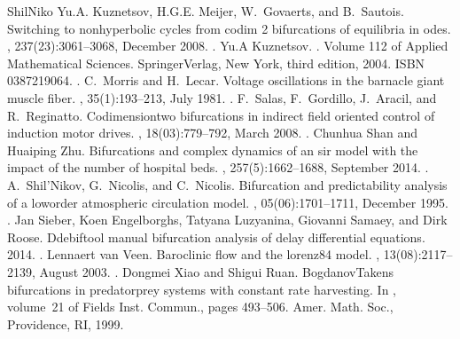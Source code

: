 \documentclass[letterpaper,10pt,english]{jupyterBook}
\begin{document}
\begin{sphinxthebibliography}{ShilNiko}
\sphinxAtStartPar
Yu.A. Kuznetsov, H.G.E. Meijer, W. Govaerts, and B. Sautois. Switching to nonhyperbolic cycles from codim 2 bifurcations of equilibria in odes. , 237(23):3061–3068, December 2008. .
\sphinxAtStartPar
Yu.A Kuznetsov. . Volume 112 of Applied Mathematical Sciences. Springer\sphinxhyphen{}Verlag, New York, third edition, 2004. ISBN 0\sphinxhyphen{}387\sphinxhyphen{}21906\sphinxhyphen{}4. .
\sphinxAtStartPar
C. Morris and H. Lecar. Voltage oscillations in the barnacle giant muscle fiber. , 35(1):193–213, July 1981. .
\sphinxAtStartPar
F. Salas, F. Gordillo, J. Aracil, and R. Reginatto. Codimension\sphinxhyphen{}two bifurcations in indirect field oriented control of induction motor drives. , 18(03):779–792, March 2008. .
\sphinxAtStartPar
Chunhua Shan and Huaiping Zhu. Bifurcations and complex dynamics of an sir model with the impact of the number of hospital beds. , 257(5):1662–1688, September 2014. .
\sphinxAtStartPar
A. Shil'Nikov, G. Nicolis, and C. Nicolis. Bifurcation and predictability analysis of a low\sphinxhyphen{}order atmospheric circulation model. , 05(06):1701–1711, December 1995. .
\sphinxAtStartPar
Jan Sieber, Koen Engelborghs, Tatyana Luzyanina, Giovanni Samaey, and Dirk Roose. Dde\sphinxhyphen{}biftool manual \sphinxhyphen{} bifurcation analysis of delay differential equations. 2014. .
\sphinxAtStartPar
Lennaert van Veen. Baroclinic flow and the lorenz\sphinxhyphen{}84 model. , 13(08):2117–2139, August 2003. .
\sphinxAtStartPar
Dongmei Xiao and Shigui Ruan. Bogdanov\sphinxhyphen{}Takens bifurcations in predator\sphinxhyphen{}prey systems with constant rate harvesting. In , volume 21 of Fields Inst. Commun., pages 493–506. Amer. Math. Soc., Providence, RI, 1999.
\end{sphinxthebibliography}







\renewcommand{\indexname}{Index}
\printindex
\end{document}
